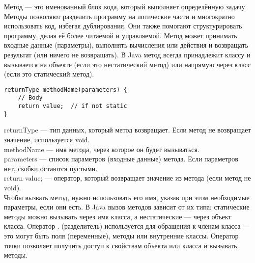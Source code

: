 Метод — это именованный блок кода, который выполняет определённую задачу. Методы позволяют разделить программу на логические части и многократно использовать код, избегая дублирования. Они также помогают структурировать программу, делая её более читаемой и управляемой. Метод может принимать входные данные (параметры), выполнять вычисления или действия и возвращать результат (или ничего не возвращать). В Java метод всегда принадлежит классу и вызывается на объекте (если это нестатический метод) или напрямую через класс (если это статический метод). \\
\begin{lstlisting}
returnType methodName(parameters) {
    // Body 
    return value;  // if not static
}
\end{lstlisting}
returnType — тип данных, который метод возвращает. Если метод не возвращает значение, используется void. \\
methodName — имя метода, через которое он будет вызываться. \\
parameters — список параметров (входные данные) метода. Если параметров нет, скобки остаются пустыми. \\
return value; — оператор, который возвращает значение из метода (если метод не void). \\
Чтобы вызвать метод, нужно использовать его имя, указав при этом необходимые параметры, если они есть. В Java вызов методов зависит от их типа: статические методы можно вызывать через имя класса, а нестатические — через объект класса. Оператор . (разделитель) используется для обращения к членам класса — это могут быть поля (переменные), методы или внутренние классы. Оператор точки позволяет получить доступ к свойствам объекта или класса и вызывать методы.
